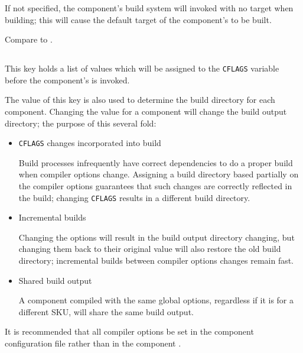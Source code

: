 If not specified, the component's build system will invoked with no
target when building; this will cause the default target of the
component's \makefile to be built.

Compare to .


\subsection{}\label{variables:cflags}

This key holds a list of values which will be assigned to the
\texttt{CFLAGS} variable before the component's \makefile is invoked.

The value of this key is also used to determine the build directory
for each component.  Changing the value for a component will change
the build output directory; the purpose of this several fold:

\begin{itemize}
\item \texttt{CFLAGS} changes incorporated into build

  Build processes infrequently have correct dependencies to do a
  proper build when compiler options change.  Assigning a build
  directory based partially on the compiler options guarantees that
  such changes are correctly reflected in the build; changing
  \texttt{CFLAGS} results in a different build directory.

\item Incremental builds

  Changing the options will result in the build output directory
  changing, but changing them back to their original value will also
  restore the old build directory; incremental builds between compiler
  options changes remain fast.

\item Shared build output

  A component compiled with the same global options, regardless if it
  is for a different SKU, will share the same build output.
\end{itemize}

It is recommended that all compiler options be set in the component
configuration file rather than in the component \makefile.


\subsection{}\label{variables:component}

